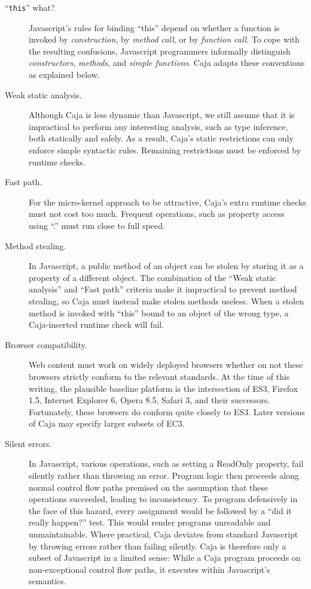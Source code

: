 \documentclass[letterpaper,twocolumn,10pt]{article}
\newcommand{\code}[1]{{\tt {#1}}}              %
\begin{document}
\begin{description}
  \item[``\code{this}'' what?] Javascript's rules for binding ``this'' depend 
  on whether a function is invoked by \emph{construction}, by \emph{method 
  call}, or by \emph{function call}. To cope with the resulting confusions, 
  Javascript programmers informally distinguish \emph{constructors}, 
  \emph{methods}, and \emph{simple functions}. Caja adapts these conventions 
  as explained below.
  
  \item[Weak static analysis.] Although Caja is less dynamic than 
  Javascript, we still assume that it is impractical to perform any 
  interesting analysis, such as type inference, both statically and safely. 
  As a result, Caja's static restrictions can only enforce simple syntactic 
  rules. Remaining restrictions must be enforced by runtime checks.
  
  \item[Fast path.] For the micro-kernel approach to be attractive, Caja's 
  extra runtime checks must not cost too much. Frequent operations, such as 
  property access using ``.'' must run close to full speed.
  
  \item[Method stealing.] In Javascript, a public method of an object can be 
  stolen by storing it as a property of a different object. The combination 
  of the ``Weak static analysis'' and ``Fast path'' criteria make it 
  impractical to prevent method stealing, so Caja must instead make stolen 
  methods useless. When a stolen method is invoked with ``this'' bound to an 
  object of the wrong type, a Caja-inserted runtime check will fail.
  
  \item[Browser compatibility.] Web content must work on widely deployed 
  browsers whether on not these browsers strictly conform to the relevant 
  standards. At the time of this writing, the plausible baseline platform is 
  the intersection of ES3, Firefox 1.5, Internet Explorer 6, Opera 8.5, 
  Safari 3, and their successors. Fortunately, these browsers do conform 
  quite closely to ES3. Later versions of Caja may specify larger subsets of 
  EC3.
  
  \item[Silent errors.] In Javascript, various operations, such as setting a 
  ReadOnly property, fail silently rather than throwing an error. Program 
  logic then proceeds along normal control flow paths premised on the 
  assumption that these operations succeeded, leading to inconsistency. To 
  program defensively in the face of this hazard, every assignment would be 
  followed by a ``did it really happen?'' test. This would render programs 
  unreadable and unmaintainable. Where practical, Caja deviates from 
  standard Javascript by throwing errors rather than failing silently. Caja 
  is therefore only a subset of Javascript in a limited sense: While a Caja 
  program proceeds on non-exceptional control flow paths, it executes within 
  Javascript's semantics.
  
\end{description}
\end{document}

